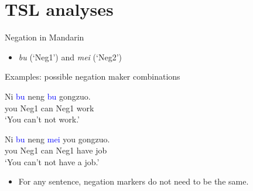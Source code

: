 \documentclass[professionalfonts, xcolor={usenames,svgnames,x11names,table}]{beamer}
\begin{document}
\section[TSL analyses]{TSL analyses}

\begin{frame}{Negation in Mandarin}

 \begin{itemize}
        \item \textit{bu} (`Neg1') and \textit{mei} (`Neg2')      
    \end{itemize}
    
\begin{exampleblock}{Examples: possible negation maker combinations}
\pause
 \begin{exe}
 \ex\label{mylabel} \gll Ni  \textcolor{blue}{bu}  neng  \textcolor{blue}{bu}  gongzuo. \\
                     you  Neg1  can  Neg1  work \\
                \glt `You  can't not work.'
    \pause

     \ex \gll Ni  \textcolor{blue}{bu}  neng  \textcolor{blue}{mei}  you gongzuo. \\
                     you  Neg1  can  Neg1  have  job \\
                \glt `You can't not have a job.' 
\end{exe} 
\pause
\begin{itemize}
\item \textcolor{cadmiumgreen}{For any sentence, negation markers do not need to be the same. }
\end{itemize}  
\end{exampleblock}

\end{frame}
\end{document}
